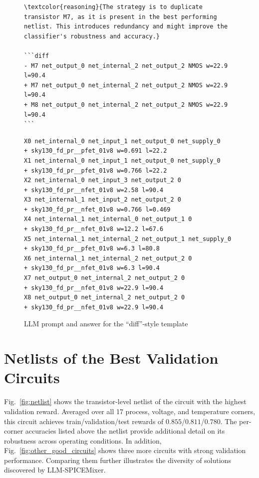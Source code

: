 \documentclass[sigconf,pbalance]{acmart_modified}
\newcommand{\squeezeSection}{}
\newcommand{\llmspm}{LLM-SPICE\-Mixer}
\begin{document}
\begin{figure}
\begin{minipage}[t]{0.44\textwidth}
\begin{prompt}
\begin{Verbatim}[breaklines=true,breaksymbolleft={},commandchars=\\\{\}]
\textcolor{reasoning}{The strategy is to duplicate transistor M7, as it is present in the best performing netlist. This introduces redundancy and might improve the classifier's robustness and accuracy.}

```diff
- M7 net_output_0 net_internal_2 net_output_2 NMOS w=22.9 l=90.4
+ M7 net_output_0 net_internal_2 net_output_2 NMOS w=22.9 l=90.4
+ M8 net_output_0 net_internal_2 net_output_2 NMOS w=22.9 l=90.4
```
\end{Verbatim}
\end{prompt}

\begin{prompt}[Extracted Netlist (Skywater-PDK): Reward = 0.770]
    \fontsize{6pt}{6pt}\selectfont
    \ttfamily\hspace*{1cm}
    \begin{Verbatim}[breaklines=true,breaksymbolleft={}]
X0 net_internal_0 net_input_1 net_output_0 net_supply_0
+ sky130_fd_pr__pfet_01v8 w=0.691 l=22.2
X1 net_internal_0 net_input_1 net_output_0 net_supply_0
+ sky130_fd_pr__pfet_01v8 w=0.766 l=22.2
X2 net_internal_0 net_input_3 net_output_2 0
+ sky130_fd_pr__nfet_01v8 w=2.58 l=90.4
X3 net_internal_1 net_input_2 net_output_2 0
+ sky130_fd_pr__nfet_01v8 w=0.766 l=0.469
X4 net_internal_1 net_internal_0 net_output_1 0
+ sky130_fd_pr__nfet_01v8 w=12.2 l=67.6
X5 net_internal_1 net_internal_2 net_output_1 net_supply_0
+ sky130_fd_pr__pfet_01v8 w=6.3 l=80.8
X6 net_internal_1 net_internal_2 net_output_2 0
+ sky130_fd_pr__nfet_01v8 w=6.3 l=90.4
X7 net_output_0 net_internal_2 net_output_2 0
+ sky130_fd_pr__nfet_01v8 w=22.9 l=90.4
X8 net_output_0 net_internal_2 net_output_2 0
+ sky130_fd_pr__nfet_01v8 w=22.9 l=90.4
\end{Verbatim}
\end{prompt}
\end{minipage}
\caption{LLM prompt and answer for the ``diff''-style template}
\label{fig:diff_style_template}
\end{figure}


\squeezeSection\section{Netlists of the Best Validation Circuits}
\label{appx:netlist}
Fig.~\ref{fig:netlist} shows the transistor-level netlist of the circuit with the highest validation reward. Averaged over all 17 process, voltage, and temperature corners, this circuit achieves train/validation/test rewards of $0.855$/$0.811$/$0.780$. The per-corner accuracies listed above the netlist provide additional detail on its robustness across operating conditions. In addition, Fig.~\ref{fig:other_good_circuits} shows three more circuits with strong validation performance. Comparing them further illustrates the diversity of solutions discovered by \llmspm{}.
\end{document}
